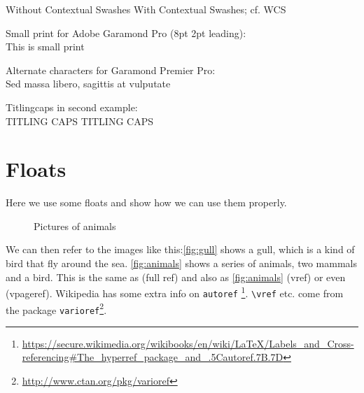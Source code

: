 \documentclass[draft=false]{book}
\begin{document}
{
\selectfont Without Contextual Swashes	\hspace{2em}
\selectfont With Contextual Swashes; cf. WCS\\
}

Small print for Adobe Garamond Pro (8pt 2pt leading):\\
{
\fontsize{8pt}{10pt}\selectfont This is small print
}

Alternate characters for Garamond Premier Pro:\\
{
 Sed massa libero, sagittis at vulputate
}

Titlingcaps in second example:\\
{
\selectfont TITLING CAPS \hspace{2em}
\selectfont TITLING CAPS\\
}

\section{Floats}

Here we use some floats and show how we can use them properly.

\begin{figure}[h!]
  \centering
  \caption{Pictures of animals}
  \label{fig:animals}
\end{figure}

We can then refer to the images like this:\autoref{fig:gull} shows a gull, 
which is a kind of bird that fly around the sea. \autoref{fig:animals} shows 
a series of animals, two mammals and a bird. This is the same as  (full ref) and also as \vref{fig:animals} (vref) or even  (vpageref). Wikipedia has some extra info on \verb!autoref! \footnote{\url{https://secure.wikimedia.org/wikibooks/en/wiki/LaTeX/Labels\_and\_Cross-referencing\#The\_hyperref\_package\_and\_.5Cautoref.7B.7D}}. \verb!\vref! etc. come from the package \texttt{varioref}\footnote{\url{http://www.ctan.org/pkg/varioref}}.
\end{document}
